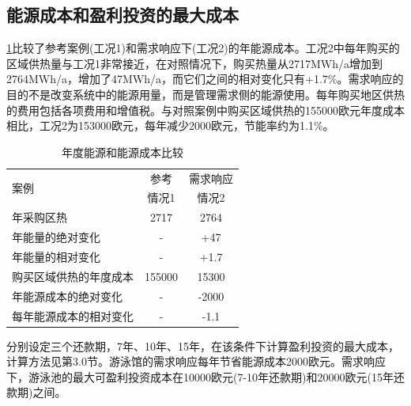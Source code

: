 \documentclass[hyperref]{ctexart}
\begin{document}
\begin{multicols}{2}
		\subsection{能源成本和盈利投资的最大成本}
		\cref{tab12}比较了参考案例(工况1)和需求响应下(工况2)的年能源成本。工况2中每年购买的区域供热量与工况1非常接近，在对照情况下，购买热量从2717MWh/a增加到2764MWh/a，增加了47MWh/a，而它们之间的相对变化只有+1.7\%。需求响应的目的不是改变系统中的能源用量，而是管理需求侧的能源使用。每年购买地区供热的费用包括各项费用和增值税。与对照案例中购买区域供热的155000欧元年度成本相比，工况2为153000欧元，每年减少2000欧元，节能率约为1.1\%。
		\par
		\begin{table}[H]
			\centering
			\caption{年度能源和能源成本比较}
			\begin{tabular}{lcc}
				\toprule
				\multirow{2}{*}{案例} & 参考 & 需求响应 \\
				~ & 情况1 & 情况2 \\
				\midrule
				年采购区热 & 2717 & 2764 \\
				年能量的绝对变化 & - & +47 \\
				年能量的相对变化 & - & +1.7\\
				购买区域供热的年度成本 & 155000 & 15300\\
				年能源成本的绝对变化 & - & -2000\\
				每年能源成本的相对变化 & - & -1.1\\
				\bottomrule
			\end{tabular}
			\label{tab12}
		\end{table}
		分别设定三个还款期，7年、10年、15年，在该条件下计算盈利投资的最大成本，计算方法见第3.0节。游泳馆的需求响应每年节省能源成本2000欧元。需求响应下，游泳池的最大可盈利投资成本在10000欧元(7-10年还款期)和20000欧元(15年还款期)之间。
		\par

\end{multicols}
\end{document}
